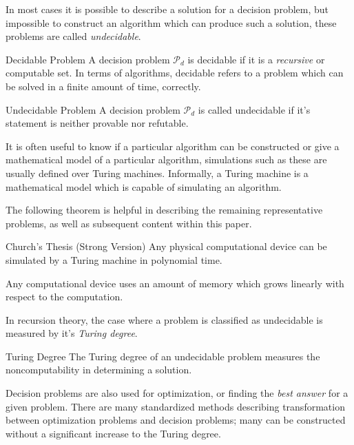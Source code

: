 In most cases it is possible to describe a solution for a decision problem, but impossible to construct an algorithm which can produce such a solution, these problems are called \emph{undecidable}. 



\begin{defn}{Decidable Problem}
    A decision problem $\mathcal{P}_{d}$ is decidable if it is a \emph{recursive} or computable set. In terms of algorithms, decidable refers to a problem which can be solved in a finite amount of time, correctly.
\end{defn}



\begin{defn}{Undecidable Problem}
    A decision problem $\mathcal{P}_{d}$ is called undecidable if it's statement is neither provable nor refutable.
\end{defn}



It is often useful to know if a particular algorithm can be constructed or give a mathematical model of a particular algorithm, simulations such as these are usually defined over Turing machines. 
Informally, a Turing machine is a mathematical model which is capable of simulating an algorithm. 



The following theorem is helpful in describing the remaining representative problems, as well as subsequent content within this paper. 


\begin{thm}{Church's Thesis (Strong Version)} 
    Any physical computational device can be simulated by a Turing machine in polynomial time.
\end{thm}


\begin{summ}
    Any computational device uses an amount of memory which grows linearly with respect to the computation.
\end{summ}

\smallskip
In recursion theory, the case where a problem is classified as undecidable is measured by it's \emph{Turing degree}. 


\begin{defn}{Turing Degree}
    The Turing degree of an undecidable problem measures the \gls{noncomputability} in determining a solution.
\end{defn}

\smallskip
\begin{exmp}
    Decision problems are also used for optimization, or finding the \emph{best answer} for a given problem. 
    There are many standardized methods describing transformation between optimization problems and decision problems; many can be constructed without a significant increase to the Turing degree.
\end{exmp}





